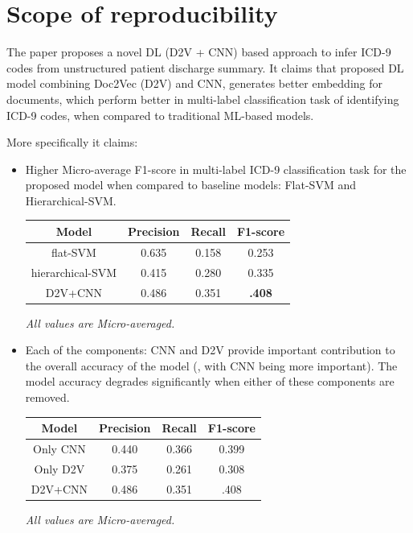 \documentclass[11pt,a4paper]{article}
\begin{document}
\section{Scope of reproducibility}

The paper proposes a novel DL (D2V + CNN) based approach to infer ICD-9 codes from unstructured patient discharge summary. It claims that proposed DL model combining Doc2Vec (D2V) and CNN, generates better embedding for documents, which perform better in multi-label classification task of identifying ICD-9 codes, when compared to traditional ML-based models.  

More specifically it claims:

\begin{itemize}
	\item Higher Micro-average F1-score in multi-label ICD-9 classification task for the proposed model when compared to baseline models: Flat-SVM and Hierarchical-SVM.
\newline

\begin{small}
\begin{tabular}{ cccc }
  \hline
  	Model & Precision & Recall & F1-score \\
  \hline
  	flat-SVM & 0.635 & 0.158 & 0.253 \\ 
  \hline
  	hierarchical-SVM & 0.415 & 0.280 & 0.335 \\ 
  \hline
  	D2V+CNN & 0.486 & 0.351 & \textbf{.408} \\ 
  \hline
\end{tabular}

\textit{All values are Micro-averaged.}
\end{small}

	\item Each of the components: CNN and D2V provide important contribution to the overall accuracy of the model (, with CNN being more important). The model accuracy degrades significantly when either of these components are removed.
\newline

\begin{small}
\begin{tabular}{ cccc }
  \hline
  	Model & Precision & Recall & F1-score \\
  \hline
  	Only CNN & 0.440 & 0.366 & 0.399 \\ 
  \hline
  	Only D2V & 0.375 & 0.261 & 0.308 \\ 
  \hline
  	D2V+CNN & 0.486 & 0.351 & .408 \\ 
  \hline
\end{tabular}

\textit{All values are Micro-averaged.}
\end{small}	
\end{itemize}
 
\end{document}
